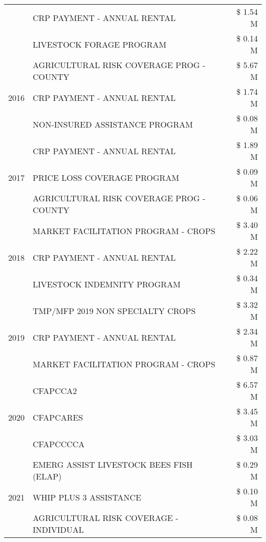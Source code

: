 \begin{tabular}{llr}
 & CRP PAYMENT - ANNUAL RENTAL & \$ 1.54 M \\
 & LIVESTOCK FORAGE PROGRAM & \$ 0.14 M \\
\cline{1-3}
\multirow[t]{3}{*}{2016} & AGRICULTURAL RISK COVERAGE PROG - COUNTY & \$ 5.67 M \\
 & CRP PAYMENT - ANNUAL RENTAL & \$ 1.74 M \\
 & NON-INSURED ASSISTANCE PROGRAM & \$ 0.08 M \\
\cline{1-3}
\multirow[t]{3}{*}{2017} & CRP PAYMENT - ANNUAL RENTAL & \$ 1.89 M \\
 & PRICE LOSS COVERAGE PROGRAM & \$ 0.09 M \\
 & AGRICULTURAL RISK COVERAGE PROG - COUNTY & \$ 0.06 M \\
\cline{1-3}
\multirow[t]{3}{*}{2018} & MARKET FACILITATION PROGRAM - CROPS & \$ 3.40 M \\
 & CRP PAYMENT - ANNUAL RENTAL & \$ 2.22 M \\
 & LIVESTOCK INDEMNITY PROGRAM & \$ 0.34 M \\
\cline{1-3}
\multirow[t]{3}{*}{2019} & TMP/MFP 2019 NON SPECIALTY CROPS & \$ 3.32 M \\
 & CRP PAYMENT - ANNUAL RENTAL & \$ 2.34 M \\
 & MARKET FACILITATION PROGRAM - CROPS & \$ 0.87 M \\
\cline{1-3}
\multirow[t]{3}{*}{2020} & CFAPCCA2 & \$ 6.57 M \\
 & CFAPCARES & \$ 3.45 M \\
 & CFAPCCCCA & \$ 3.03 M \\
\cline{1-3}
\multirow[t]{3}{*}{2021} & EMERG ASSIST LIVESTOCK BEES FISH (ELAP) & \$ 0.29 M \\
 & WHIP PLUS 3 ASSISTANCE & \$ 0.10 M \\
 & AGRICULTURAL RISK COVERAGE - INDIVIDUAL & \$ 0.08 M \\
\cline{1-3}
\bottomrule
\end{tabular}
